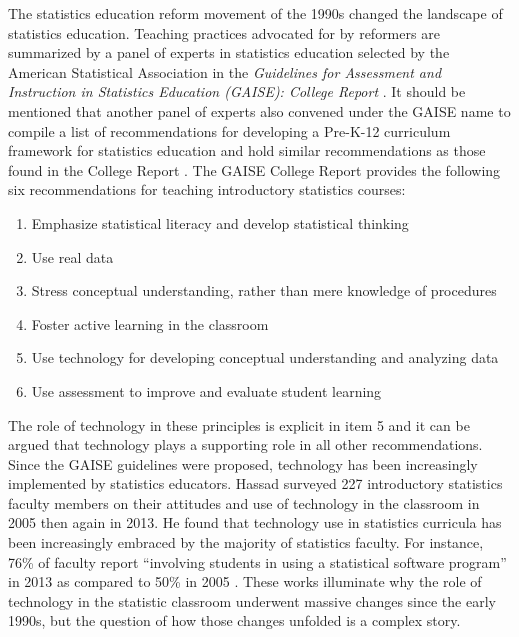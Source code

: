 \documentclass[11pt]{isuthesis}\usepackage[]{graphicx}\usepackage[]{color}
\begin{document}
The statistics education reform movement of the 1990s changed the landscape of statistics education. Teaching practices advocated for by reformers are summarized by a panel of experts in statistics education selected by the American Statistical Association in the \textit{Guidelines for Assessment and Instruction in Statistics Education (GAISE): College Report} \citep{GAISEcollege}. It should be mentioned that another panel of experts also convened under the GAISE name to compile a list of recommendations for developing a Pre-K-12 curriculum framework for statistics education and hold similar recommendations as those found in the College Report \citep{GAISEk12}.  The GAISE College Report provides the following six recommendations for teaching introductory statistics courses:

\begin{enumerate}
\item Emphasize statistical literacy and develop statistical thinking
\item Use real data
\item Stress conceptual understanding, rather than mere knowledge of procedures
\item Foster active learning in the classroom 
\item Use technology for developing conceptual understanding and analyzing data
\item Use assessment to improve and evaluate student learning
\end{enumerate}

The role of technology in these principles is explicit in item 5 and it can be argued that technology plays a supporting role in all other recommendations. Since the GAISE guidelines were proposed, technology has been increasingly implemented by statistics educators. Hassad surveyed 227 introductory statistics faculty members on their attitudes and use of technology in the classroom in 2005 then again in 2013. He found that technology use in statistics curricula has been increasingly embraced by the majority of statistics faculty. For instance, 76\% of faculty report ``involving students in using a statistical software program'' in 2013 as compared to 50\% in 2005 \citep{Hassad2013}. These works illuminate why the role of technology in the statistic classroom underwent massive changes since the early 1990s, but the question of how those changes unfolded is a complex story.
\end{document}

